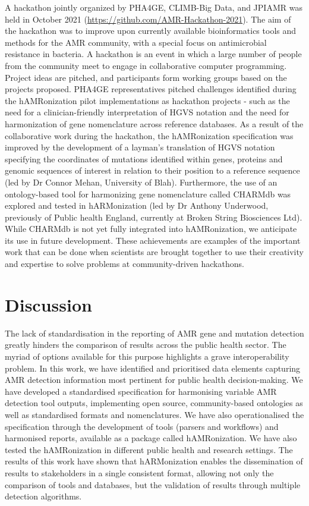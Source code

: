 A hackathon jointly organized by PHA4GE, CLIMB-Big Data, and JPIAMR was held in October 2021 (\url{https://github.com/AMR-Hackathon-2021}). The aim of the hackathon was to improve upon currently available bioinformatics tools and methods for the AMR community, with a special focus on antimicrobial resistance in bacteria. A hackathon is an event in which a large number of people from the community meet to engage in collaborative computer programming. Project ideas are pitched, and participants form working groups based on the projects proposed. PHA4GE representatives pitched challenges identified during the hAMRonization pilot implementations as hackathon projects - such as the need for a clinician-friendly interpretation of HGVS notation and the need for harmonization of gene nomenclature across reference databases. As a result of the collaborative work during the hackathon, the hAMRonization specification was improved by the development of a layman’s translation of HGVS notation specifying the coordinates of mutations identified within genes, proteins and genomic sequences of interest in relation to their position to a reference sequence (led by Dr Connor Mehan, University of Blah). Furthermore, the use of an ontology-based tool for harmonizing gene nomenclature called CHARMdb was explored and tested in hARMonization  (led by Dr Anthony Underwood, previously of Public health England, currently at Broken String Biosciences Ltd). While CHARMdb is not yet fully integrated into hAMRonization, we anticipate its use in future development. These achievements are examples of the important work that can be done when scientists are brought together to use their creativity and expertise to solve problems at community-driven hackathons.

\section{Discussion}

The lack of standardisation in the reporting of AMR gene and mutation detection greatly hinders the comparison of results across the public health sector. The myriad of options available for this purpose highlights a grave interoperability problem. In this work, we have identified and prioritised data elements capturing AMR detection information most pertinent for public health decision-making. We have developed a standardised specification for harmonising variable AMR detection tool outputs, implementing open source, community-based ontologies as well as standardised formats and nomenclatures. We have also operationalised the specification through the development of tools (parsers and workflows) and harmonised reports, available as a package called hAMRonization. We have also tested the hAMRonization in different public health and research settings. The results of this work have shown that hARMonization enables the dissemination of results to stakeholders in a single consistent format, allowing not only the comparison of tools and databases, but the validation of results through multiple detection algorithms. 

